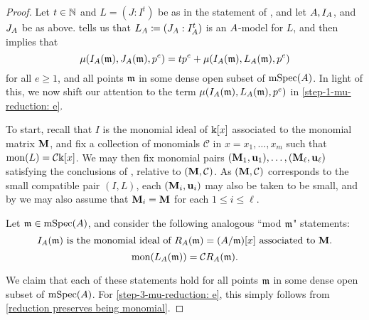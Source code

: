 \documentclass{amsart}
\begin{document}
\begin{proof}  Let $t \in \mathbb{N}$ and $L = (J: I^t)$ be as in the statement of , and let $A, I_A$, and $J_A$ be as above.   tells us that $L_A \coloneqq (J_A: I_A^t)$ is an $A$-model for $L$, and  then implies that
\begin{equation}
\label{step-1-mu-reduction: e}
\mu(I_A(\mathfrak{m}), J_A(\mathfrak{m}), p^e) = t p^e + \mu(I_A(\mathfrak{m}), L_A(\mathfrak{m}), p^e)
 \end{equation}
%
for all $e \geq 1$, and all points $\mathfrak{m}$ in some dense open subset of $\operatorname{mSpec}(A)$.  In light of this, we now shift our attention to the  term $\mu(I_A(\mathfrak{m}), L_A(\mathfrak{m}), p^e)$ in \eqref{step-1-mu-reduction: e}.  

To start, recall that $I$ is the monomial ideal of $\Bbbk[x]$ associated to the monomial matrix $\mathbf{M}$, and fix a collection of monomials $\mathcal{C}$ in $x=x_1, \ldots, x_m$ such that $\operatorname{mon}(L) = \mathcal{C} \Bbbk[x]$.   We may then fix monomial pairs $(\mathbf{M}_1, \mathbf{u}_1), \ldots, (\mathbf{M}_{\ell}, \mathbf{u}_{\ell})$ satisfying the conclusions of , relative to $(\mathbf{M}, \mathcal{C})$.  As $(\mathbf{M}, \mathcal{C})$ corresponds to the small compatible pair $(I, L)$, each $(\mathbf{M}_i, \mathbf{u}_i)$ may also be taken to be small, and by  we may also assume that $\mathbf{M}_i = \mathbf{M}$ for each $1 \leq i \leq \ell$. 

Let $\mathfrak{m} \in \operatorname{mSpec}(A)$, and consider the following analogous ``mod $\mathfrak{m}$" statements:
%
\begin{equation}
\label{step-3-mu-reduction: e}
\text{$I_A(\mathfrak{m})$ is the monomial ideal of $R_A(\mathfrak{m}) = (A/\mathfrak{m})[x]$ associated to $\mathbf{M}$.}
\end{equation}
%
\begin{equation}
\label{step-2-mu-reduction: e}
\operatorname{mon}(L_A(\mathfrak{m})) = \mathcal{C} R_A(\mathfrak{m}).
\end{equation}


We claim that each of these statements hold for all points $\mathfrak{m}$ in some dense open subset of $\operatorname{mSpec}(A)$.  For \eqref{step-3-mu-reduction: e}, this simply follows from  \ref{reduction preserves being monomial}.  


\end{proof}
\end{document}
